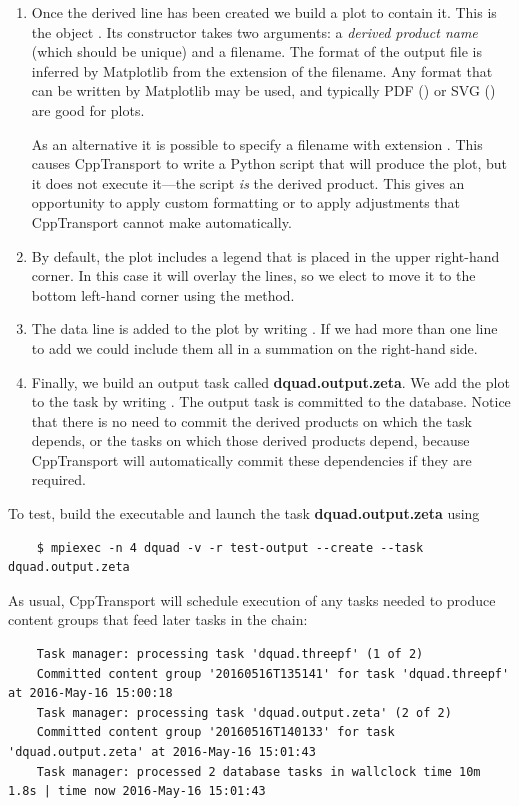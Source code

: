 \documentclass[11pt,a4paper]{article}
\renewcommand{\texttt}[1]{{\ttfamily\fontseries{l}\selectfont{#1}}}
\newcommand{\repoobject}[1]{{\ttfamily\bfseries\small #1}}
\newcommand{\packagefont}{\sffamily}
\newcommand{\CppTransport}{{\packagefont CppTransport}}
\newcommand{\Matplotlib}{{\packagefont Matplotlib}}
\newcommand{\file}[1]{\texttt{{#1}}}
\begin{document}
\begin{enumerate}
	\item Once the derived line has been created we build a plot
	to contain it. This is the object
	\texttt{time_series_plot<>}.
	Its constructor takes two arguments:
	a \emph{derived product name} (which should be unique)
	and a filename.
	The format of the output file is inferred by
	{\Matplotlib} from the extension of the filename.
	Any format that can be written by {\Matplotlib} may be used,
	and typically PDF (\file{.pdf}) or SVG (\file{.svg})
	are good for plots.
	
	As an alternative it is possible to specify a filename with extension
	\file{.py}.
	This causes {\CppTransport} to write a Python script that will produce
	the plot, but it does not execute it---the script \emph{is} the derived
	product.
	This gives an opportunity to apply custom formatting or to apply
	adjustments that {\CppTransport} cannot make automatically.
	
	\item By default, the plot includes a legend
	that is placed in the upper right-hand corner.
	In this case it will overlay the lines, so we elect to move it to the bottom
	left-hand corner using the
	\texttt{set_legend_position()} method.
	
	\item The data line \texttt{bg_fields} is added to the plot
	by writing
	\texttt{bg_plot += bg_fields}.
	If we had more than one line to add we could include them all in a summation
	on the right-hand side.
	
	\item Finally, we build an output task called
	\repoobject{dquad.output.zeta}. We add the plot to the task
	by writing
	\texttt{out_tk += bg_plot}.
	The output task is committed to the database.
	Notice that there is no need to commit the derived products on which the
	task depends,
	or the tasks on which those derived products depend,
	because {\CppTransport} will automatically commit these dependencies if they are
	required.
\end{enumerate}
To test, build the executable and launch the task
\repoobject{dquad.output.zeta} using
\begin{verbatim}
	$ mpiexec -n 4 dquad -v -r test-output --create --task dquad.output.zeta	
\end{verbatim}
As usual, {\CppTransport} will schedule execution of any tasks needed to produce
content groups that feed later tasks in the chain:
\begin{verbatim}
    Task manager: processing task 'dquad.threepf' (1 of 2)
    Committed content group '20160516T135141' for task 'dquad.threepf' at 2016-May-16 15:00:18
    Task manager: processing task 'dquad.output.zeta' (2 of 2)
    Committed content group '20160516T140133' for task 'dquad.output.zeta' at 2016-May-16 15:01:43
    Task manager: processed 2 database tasks in wallclock time 10m 1.8s | time now 2016-May-16 15:01:43
\end{verbatim}
\end{document}
